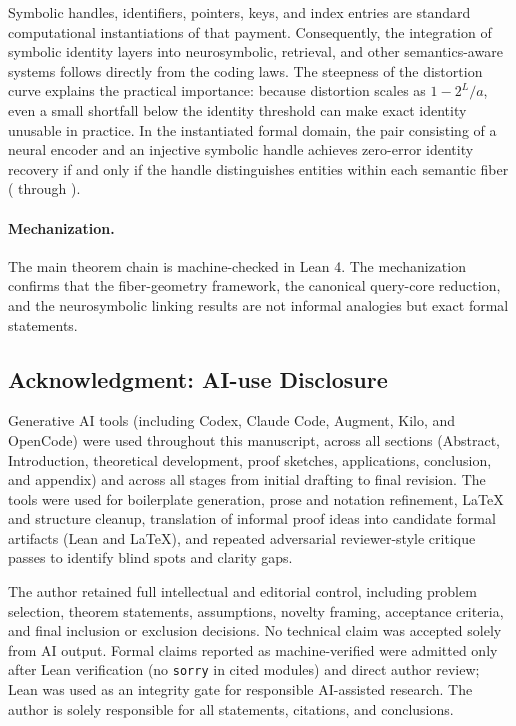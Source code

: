 Symbolic handles, identifiers, pointers, keys, and index entries are standard computational instantiations of that payment. Consequently, the integration of symbolic identity layers into neurosymbolic, retrieval, and other semantics-aware systems follows directly from the coding laws. The steepness of the distortion curve explains the practical importance: because distortion scales as $1-2^L/a$, even a small shortfall below the identity threshold can make exact identity unusable in practice. In the instantiated formal domain, the pair consisting of a neural encoder and an injective symbolic handle achieves zero-error identity recovery if and only if the handle distinguishes entities within each semantic fiber ( through ).

\paragraph{Mechanization.}
The main theorem chain is machine-checked in Lean 4. The mechanization confirms that the fiber-geometry framework, the canonical query-core reduction, and the neurosymbolic linking results are not informal analogies but exact formal statements.

\subsection*{Acknowledgment: AI-use Disclosure}

Generative AI tools (including Codex, Claude Code, Augment, Kilo, and OpenCode) were used throughout this manuscript, across all sections (Abstract, Introduction, theoretical development, proof sketches, applications, conclusion, and appendix) and across all stages from initial drafting to final revision. The tools were used for boilerplate generation, prose and notation refinement, LaTeX and structure cleanup, translation of informal proof ideas into candidate formal artifacts (Lean and LaTeX), and repeated adversarial reviewer-style critique passes to identify blind spots and clarity gaps.

The author retained full intellectual and editorial control, including problem selection, theorem statements, assumptions, novelty framing, acceptance criteria, and final inclusion or exclusion decisions. No technical claim was accepted solely from AI output. Formal claims reported as machine-verified were admitted only after Lean verification (no \texttt{sorry} in cited modules) and direct author review; Lean was used as an integrity gate for responsible AI-assisted research. The author is solely responsible for all statements, citations, and conclusions.
